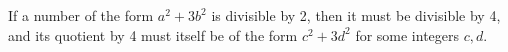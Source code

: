 If a number of the form $a^2 + 3b^2$ is divisible by 2, then it must be divisible by 4, and its quotient by 4 must itself be of the form $c^2 + 3d^2$ for some integers $c, d$.
